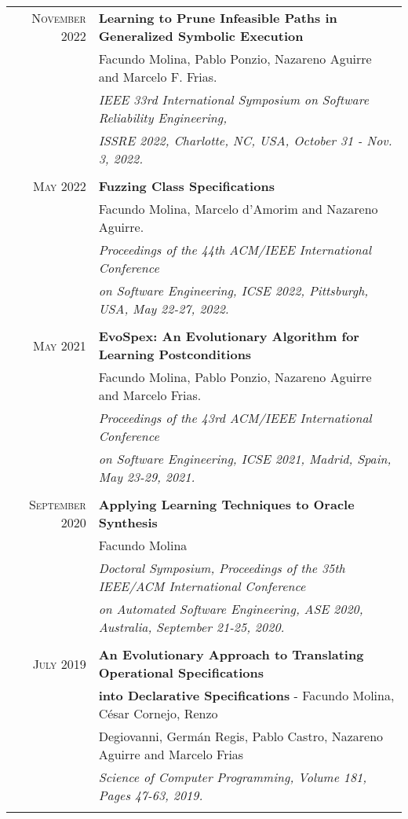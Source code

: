 \documentclass[a4paper,10pt]{article} %
\begin{document}
\begin{longtable}{rl}
\textsc{November} 2022  & \textbf{Learning to Prune Infeasible Paths in Generalized Symbolic Execution} \\
        & Facundo Molina, Pablo Ponzio, Nazareno Aguirre and Marcelo F. Frias.\\
        & \textit{IEEE 33rd International Symposium on Software Reliability Engineering,} \\
        & \textit{ISSRE 2022, Charlotte, NC, USA, October 31 - Nov. 3, 2022.} \\ & \\

\textsc{May} 2022  & \textbf{Fuzzing Class Specifications} \\
	& Facundo Molina, Marcelo d'Amorim and Nazareno Aguirre. \\
	& \textit{Proceedings of the 44th ACM/IEEE International Conference} \\
	& \textit{on Software Engineering, ICSE 2022, Pittsburgh, USA, May 22-27, 2022.} \\ & \\

\textsc{May} 2021  & \textbf{EvoSpex: An Evolutionary Algorithm for Learning Postconditions} \\
& Facundo Molina, Pablo Ponzio, Nazareno Aguirre and Marcelo Frias. \\
& \textit{Proceedings of the 43rd ACM/IEEE International Conference} \\
& \textit{on Software Engineering, ICSE 2021, Madrid, Spain, May 23-29, 2021.} \\ & \\

\textsc{September} 2020  & \textbf{Applying Learning Techniques to Oracle Synthesis} \\
& Facundo Molina \\
& \textit{Doctoral Symposium, Proceedings of the 35th IEEE/ACM International Conference} \\
& \textit{on Automated Software Engineering, ASE 2020, Australia, September 21-25, 2020.} \\ & \\

\textsc{July} 2019  & \textbf{An Evolutionary Approach to Translating Operational Specifications} \\ & \textbf{into Declarative Specifications} - Facundo Molina, César Cornejo, Renzo\\ 
& Degiovanni, Germán Regis, Pablo Castro, Nazareno Aguirre and Marcelo Frias \\
& \textit{Science of Computer Programming, Volume 181, Pages 47-63, 2019.} \\ & \\


\end{longtable}
\end{document}
